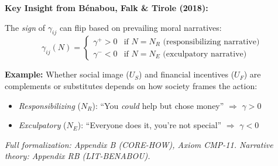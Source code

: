 \begin{tcolorbox}[
    colback=green!5!white,
    colframe=green!60!black,
    title={\textbf{Advanced: Narrative Modulation of $\gamma$ (Axiom CMP-11)}},
    fonttitle=\bfseries
]
\textbf{Key Insight from Bénabou, Falk \& Tirole (2018):}

The \textit{sign} of $\gamma_{ij}$ can flip based on prevailing moral narratives:
\begin{equation}
\gamma_{ij}(N) = \begin{cases}
\gamma^{+} > 0 & \text{if } N = N_R \text{ (responsibilizing narrative)} \\
\gamma^{-} < 0 & \text{if } N = N_E \text{ (exculpatory narrative)}
\end{cases}
\end{equation}

\textbf{Example:} Whether social image ($U_S$) and financial incentives ($U_F$) are complements or substitutes depends on how society frames the action:
\begin{itemize}[nosep]
    \item \textit{Responsibilizing} ($N_R$): ``You \textit{could} help but chose money'' $\Rightarrow$ $\gamma > 0$
    \item \textit{Exculpatory} ($N_E$): ``Everyone does it, you're not special'' $\Rightarrow$ $\gamma < 0$
\end{itemize}

\medskip
\textit{Full formalization: Appendix B (CORE-HOW), Axiom CMP-11. Narrative theory: Appendix RB (LIT-BENABOU).}
\end{tcolorbox}

